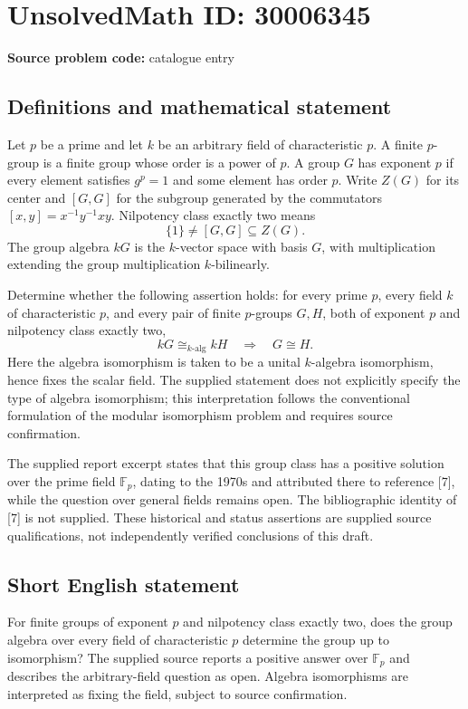 \documentclass[11pt]{article}
\newcommand{\F}{\mathbb{F}}
\begin{document}
\section*{UnsolvedMath ID: 30006345}
\textbf{Source problem code:} catalogue entry
\subsection{Definitions and mathematical statement}
Let \(p\) be a prime and let \(k\) be an arbitrary field of characteristic \(p\). A finite \(p\)-group is a finite group whose order is a power of \(p\). A group \(G\) has exponent \(p\) if every element satisfies \(g^p=1\) and some element has order \(p\). Write \(Z(G)\) for its center and \([G,G]\) for the subgroup generated by the commutators \([x,y]=x^{-1}y^{-1}xy\). Nilpotency class exactly two means
\[
\{1\}\ne [G,G]\subseteq Z(G).
\]
The group algebra \(kG\) is the \(k\)-vector space with basis \(G\), with multiplication extending the group multiplication \(k\)-bilinearly.

Determine whether the following assertion holds: for every prime \(p\), every field \(k\) of characteristic \(p\), and every pair of finite \(p\)-groups \(G,H\), both of exponent \(p\) and nilpotency class exactly two,
\[
kG\cong_{k\text{-alg}}kH
\quad\Longrightarrow\quad
G\cong H.
\]
Here the algebra isomorphism is taken to be a unital \(k\)-algebra isomorphism, hence fixes the scalar field. The supplied statement does not explicitly specify the type of algebra isomorphism; this interpretation follows the conventional formulation of the modular isomorphism problem and requires source confirmation.

The supplied report excerpt states that this group class has a positive solution over the prime field \(\F_p\), dating to the 1970s and attributed there to reference [7], while the question over general fields remains open. The bibliographic identity of [7] is not supplied. These historical and status assertions are supplied source qualifications, not independently verified conclusions of this draft.
\subsection{Short English statement}
For finite groups of exponent \(p\) and nilpotency class exactly two, does the group algebra over every field of characteristic \(p\) determine the group up to isomorphism? The supplied source reports a positive answer over \(\F_p\) and describes the arbitrary-field question as open. Algebra isomorphisms are interpreted as fixing the field, subject to source confirmation.
\end{document}
